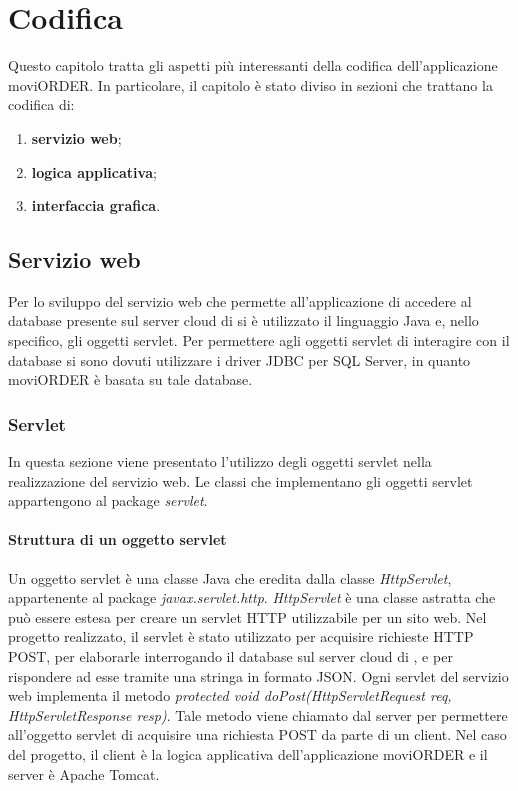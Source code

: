 \chapter{Codifica}

Questo capitolo tratta gli aspetti più interessanti della codifica dell'applicazione moviORDER. In particolare, il capitolo è stato diviso in sezioni che trattano la codifica di:
\begin{enumerate}
	\item \textbf{servizio web};
	\item \textbf{logica applicativa};
	\item \textbf{interfaccia grafica}.
\end{enumerate}

\section{Servizio web} \label{codificaservizio}

Per lo sviluppo del servizio web che permette all'applicazione di accedere al database presente sul server cloud di \visione{} si è utilizzato il linguaggio Java e, nello specifico, gli oggetti servlet. Per permettere agli oggetti servlet di interagire con il database si sono dovuti utilizzare i driver JDBC per SQL Server, in quanto moviORDER è basata su tale database. 

\subsection{Servlet}

In questa sezione viene presentato l'utilizzo degli oggetti servlet nella realizzazione del servizio web. Le classi che implementano gli oggetti servlet appartengono al package \textit{servlet}.

\subsubsection{Struttura di un oggetto servlet}

Un oggetto servlet è una classe Java che eredita dalla classe \textit{HttpServlet}, appartenente al package \textit{javax.servlet.http}. \textit{HttpServlet} è una classe astratta che può essere estesa per creare un servlet HTTP utilizzabile per un sito web. Nel progetto realizzato, il servlet è stato utilizzato per acquisire richieste HTTP POST, per elaborarle interrogando il database sul server cloud di \visione{}, e per rispondere ad esse tramite una stringa in formato JSON. Ogni servlet del servizio web implementa il metodo \textit{protected void doPost(HttpServletRequest req, HttpServletResponse resp)}. Tale metodo viene chiamato dal server per permettere all'oggetto servlet di acquisire una richiesta POST da parte di un client. Nel caso del progetto, il client è la logica applicativa dell'applicazione moviORDER e il server è Apache Tomcat.

